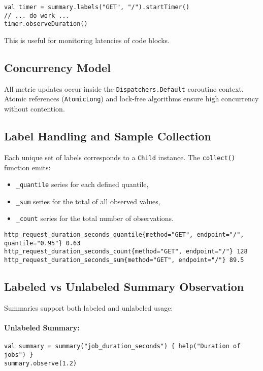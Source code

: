 \begin{verbatim}
val timer = summary.labels("GET", "/").startTimer()
// ... do work ...
timer.observeDuration()
\end{verbatim}

This is useful for monitoring latencies of code blocks.

\subsection{Concurrency Model}

All metric updates occur inside the \texttt{Dispatchers.Default} coroutine context. Atomic references (\texttt{AtomicLong}) and lock-free algorithms ensure high concurrency without contention.

\subsection{Label Handling and Sample Collection}

Each unique set of labels corresponds to a \texttt{Child} instance. The \texttt{collect()} function emits:

\begin{itemize}
    \item \texttt{\_quantile} series for each defined quantile, 
    \item \texttt{\_sum} series for the total of all observed values, 
    \item \texttt{\_count} series for the total number of observations. 
\end{itemize}


\begin{verbatim}
http_request_duration_seconds_quantile{method="GET", endpoint="/", quantile="0.95"} 0.63
http_request_duration_seconds_count{method="GET", endpoint="/"} 128
http_request_duration_seconds_sum{method="GET", endpoint="/"} 89.5
\end{verbatim}

\subsection{Labeled vs Unlabeled Summary Observation}

Summaries support both labeled and unlabeled usage:

\paragraph{Unlabeled Summary:}
\begin{verbatim}
val summary = summary("job_duration_seconds") { help("Duration of jobs") }
summary.observe(1.2)
\end{verbatim}

